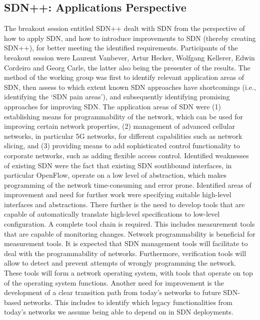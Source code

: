 \subsection{SDN++: Applications Perspective}

The breakout session entitled SDN++ dealt with SDN from the perspective of how
to apply SDN, and how to introduce improvements to SDN (thereby creating
SDN++), for better meeting the identified requirements.  Participants of the
breakout session were Laurent Vanbever, Artur Hecker, Wolfgang Kellerer,
Edwin Cordeiro and Georg Carle, the latter also being the presenter of the
results.  The method of the working group was first to identify relevant
application areas of SDN, then assess to which extent known SDN approaches
have shortcomings (i.e., identifying the `SDN pain areas'), and subsequently
identifying promising approaches for improving SDN\@.  The application areas of
SDN were (1) establishing means for programmability of the network, which can
be used for improving certain network properties, (2) management of advanced
cellular networks, in particular 5G networks, for different capabilities such
as network slicing, and (3) providing means to add sophisticated control
functionality to corporate networks, such as adding flexible access control.
Identified weaknesses of existing SDN were the fact that existing SDN
southbound interfaces, in particular OpenFlow, operate on a low level of
abstraction, which makes programming of the network time-consuming and error
prone.  Identified areas of improvement and need for further work were
specifying suitable high-level interfaces and abstractions.  There further is
the need to develop tools that are capable of automatically translate
high-level specifications to low-level configuration. A complete tool chain is
required.  This includes measurement tools that are capable of monitoring
changes. Network programmability is beneficial for measurement tools.  It is
expected that SDN management tools will facilitate to deal with the
programmability of networks.  Furthermore, verification tools will allow to
detect and prevent attempts of wrongly programming the network.    These tools
will form a network operating system, with tools that operate on top of the
operating system functions.  Another need for improvement is the development
of a clear transition path from today's networks to future SDN-based networks.
This includes to identify which legacy functionalities from today's networks
we assume being able to depend on in SDN deployments.


